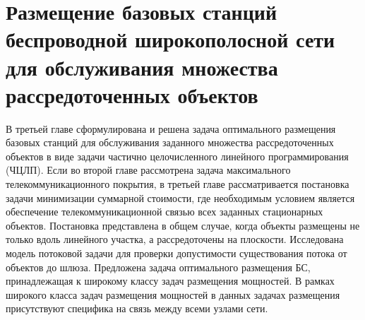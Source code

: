 \chapter{Размещение базовых станций беспроводной широкополосной сети для обслуживания множества рассредоточенных объектов}\label{ch:ch3}
 


В третьей главе сформулирована и решена задача оптимального размещения базовых станций для обслуживания заданного множества рассредоточенных объектов в виде задачи частично целочисленного линейного программирования (ЧЦЛП). Если во второй главе рассмотрена задача максимального телекоммуникационного покрытия, в третьей главе рассматривается постановка задачи минимизации суммарной стоимости, где необходимым условием является обеспечение телекоммуникационной связью всех заданных стационарных объектов.
Постановка представлена в общем случае, когда объекты размещены не только вдоль линейного участка, а рассредоточены на плоскости. Исследована модель потоковой задачи для проверки допустимости существования потока от объектов до шлюза. Предложена задача оптимального размещения БС, принадлежащая к широкому классу задач размещения мощностей. В рамках широкого класса задач размещения мощностей в данных задачах размещения присутствуют специфика на связь между всеми узлами сети.




